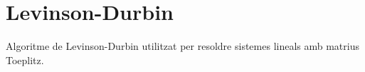 \chapter{Levinson-Durbin}
Algoritme de Levinson-Durbin utilitzat per resoldre sistemes lineals amb matrius Toeplitz.